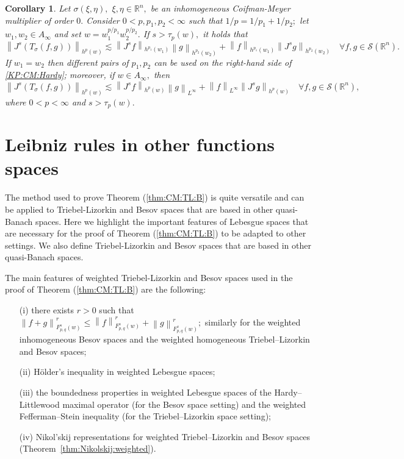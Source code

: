 \documentclass[10pt,a4paper]{article}
\newtheorem{corollary}[theorem]{Corollary}
\theoremstyle{remark}
\newcommand{\rn}{{{\mathbb R}^n}}
\newcommand{\sw}{{\mathcal{S}}(\rn)}
\newcommand{\itlw}[4]{F_{#1,#3}^{#2}(#4)} %
\newcommand{\norm}[2]{\left\|#1\right\|_{#2}}
\newcommand{\hcline}{1/p=1/p_1+1/p_2}
\begin{document}
 
 \begin{corollary}\label{coro:KP:CM:Hardyloc}  Let $\sigma(\xi,\eta),$ $\xi,\eta\in\rn,$ be an inhomogeneous Coifman-Meyer multiplier of order $0.$ 
Consider  $0 < p, p_1, p_2  < \infty$  such that $\hcline;$ let  $w_1,w_2\in A_\infty$ and set $w=w_1^{{p}/{p_1}} w_2^{{p}/{p_2}}.$ 
If  $s > \tau_p(w),$ it holds that
\begin{equation*}
\norm{J^s(T_\sigma(f,g))}{h^p(w)} \lesssim \norm{J^s f}{h^{p_1}(w_1)} \norm{g}{h^{p_2}(w_2)} +  \norm{f}{h^{p_1}(w_1)}   \norm{J^s g}{h^{p_2}(w_2)} \quad \forall f, g \in \sw.
\end{equation*}
If $w_1=w_2$ then different pairs of $p_1, p_2$ can be used on the right-hand side of \eqref{KP:CM:Hardy}; moreover, if $w\in A_\infty,$ then 
\begin{equation*}
\norm{J^s(T_\sigma(f,g))}{h^p(w)} \lesssim \norm{J^s f}{h^{p}(w)} \norm{g}{L^\infty} +  \norm{f}{L^\infty}   \norm{J^s g}{h^{p}(w)} \quad \forall f, g \in \sw,
\end{equation*}
where $0<p<\infty$ and $s>\tau_{p}(w).$
\end{corollary}
 
 \section{Leibniz rules in other functions spaces}\label{ch2_othersettings}
 The method used to prove Theorem (\ref{thm:CM:TL:B}) is quite versatile and can be applied to Triebel-Lizorkin and Besov spaces that are based in other quasi-Banach spaces. Here we highlight the important features of Lebesgue spaces that are necessary for the proof of Theorem (\ref{thm:CM:TL:B}) to be adapted to other settings. We also define Triebel-Lizorkin and Besov spaces that are based in other quasi-Banach spaces. 
 
The main features of weighted Triebel-Lizorkin and Besov spaces used in the proof of Theorem (\ref{thm:CM:TL:B}) are the following:
\begin{enumerate}
\item[(i)]\label{item:first} there exists $r>0$ such that $\norm{f+g}{\itlw{p}{s}{q}{w}}^r\le \norm{f}{\itlw{p}{s}{q}{w}}^r+\norm{g}{\itlw{p}{s}{q}{w}}^r;$ similarly for the weighted inhomogeneous  Besov spaces and the weighted homogeneous  Triebel--Lizorkin and Besov spaces;
\item[(ii)] \label{item:second} H\"older's inequality in weighted Lebesgue spaces;
\item[(iii)] \label{item:third}  the boundedness properties in weighted Lebesgue spaces  of the Hardy--Littlewood maximal operator (for the Besov space setting) and the weighted Fefferman--Stein inequality (for the Triebel--Lizorkin space setting);
\item[(iv)] \label{item:last} Nikol'skij representations for weighted Triebel--Lizorkin and Besov spaces (Theorem~\ref{thm:Nikolskij:weighted}).
\end{enumerate}
\end{document}
